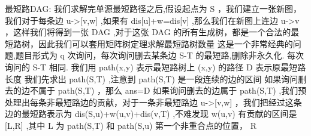 {}最短路DAG:\markdownRendererParagraphSeparator
{}我们求解完单源最短路径之后,假设起点为\markdownRendererDollarSign{} S \markdownRendererDollarSign{}，我们建立一张新图，我们对于每条边\markdownRendererDollarSign{} u->[v,w] \markdownRendererDollarSign{},如果有\markdownRendererDollarSign{} dis[u]+w=dis[v] \markdownRendererDollarSign{},那么我们在新图上连边\markdownRendererDollarSign{} u->v \markdownRendererDollarSign{}，这样我们将得到一张\markdownRendererDollarSign{} DAG\markdownRendererSoftLineBreak
{}\markdownRendererDollarSign{},对于这张\markdownRendererDollarSign{} DAG\markdownRendererSoftLineBreak
{}\markdownRendererDollarSign{}的所有生成树，都是一个合法的最短路树，因此我们可以套用矩阵树定理求解最短路树数量\markdownRendererInterblockSeparator
{}
\markdownRendererSectionEnd \markdownRendererSectionBegin
{}\markdownRendererInterblockSeparator
{}这是一个非常经典的问题,题目形式为\markdownRendererDollarSign{} q \markdownRendererDollarSign{}次询问，每次询问删去某条边\markdownRendererDollarSign{} S-T \markdownRendererDollarSign{}的最短路,删除非永久化.\markdownRendererParagraphSeparator
{}每次询问的\markdownRendererDollarSign{} S-T \markdownRendererDollarSign{}相同.\markdownRendererParagraphSeparator
{}我们用\markdownRendererDollarSign{} path(x,y) \markdownRendererDollarSign{}表示最短路树上\markdownRendererDollarSign{} (x,y) \markdownRendererDollarSign{}的路径 \markdownRendererDollarSign{} D\markdownRendererSoftLineBreak
{}\markdownRendererDollarSign{}表示原最短路长度\markdownRendererParagraphSeparator
{}我们先求出\markdownRendererDollarSign{} path(S,T) \markdownRendererDollarSign{},注意到\markdownRendererDollarSign{} path(S,T) \markdownRendererDollarSign{}是一段连续的边的区间\markdownRendererParagraphSeparator
{}如果询问删去的边不属于\markdownRendererDollarSign{} path(S,T) \markdownRendererDollarSign{}，那么\markdownRendererDollarSign{} ans=D \markdownRendererDollarSign{}\markdownRendererParagraphSeparator
{}如果询问删去的边属于\markdownRendererDollarSign{} path(S,T) \markdownRendererDollarSign{},我们预处理出每条非最短路边的贡献，对于一条非最短路边\markdownRendererDollarSign{} u->[v,w] \markdownRendererDollarSign{}，我们把经过这条边的最短路表示为\markdownRendererDollarSign{} dis(S,u)+w(u,v)+dis(v,T) \markdownRendererDollarSign{},不难发现\markdownRendererDollarSign{} w(u,v) \markdownRendererDollarSign{}有贡献的区间是\markdownRendererDollarSign{} [L,R] \markdownRendererDollarSign{},其中\markdownRendererDollarSign{} L\markdownRendererSoftLineBreak
{}\markdownRendererDollarSign{}为\markdownRendererDollarSign{} path(S,T) \markdownRendererDollarSign{}和\markdownRendererDollarSign{} path(S,u) \markdownRendererDollarSign{}第一个非重合点的位置，\markdownRendererDollarSign{} R\markdownRendererParagraphSeparator
